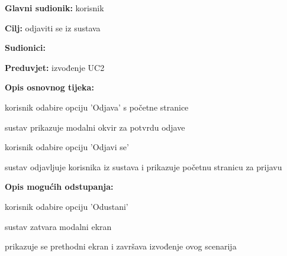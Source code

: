 					\noindent {}
					\begin{packed_item}
	
						\item \textbf{Glavni sudionik: }korisnik
						\item  \textbf{Cilj:} odjaviti se iz sustava 
						\item  \textbf{Sudionici:} 
						\item  \textbf{Preduvjet:} izvođenje UC2
						\item  \textbf{Opis osnovnog tijeka:}
						
						\item[] \begin{packed_enum}
							\item korisnik odabire opciju 'Odjava' s početne stranice
							\item sustav prikazuje modalni okvir za potvrdu odjave
							\item korisnik odabire opciju 'Odjavi se'
							\item sustav odjavljuje korisnika iz sustava i prikazuje početnu stranicu za prijavu

						\end{packed_enum}

						\item  \textbf{Opis mogućih odstupanja:}
						
						\item[] \begin{packed_item}
	
							\item[3.a] korisnik odabire opciju 'Odustani'
							\item [] \begin{packed_enum}
								\item sustav zatvara modalni ekran
								\item prikazuje se prethodni ekran i završava izvođenje ovog scenarija
							\end{packed_enum}
						\end{packed_item}
					\end{packed_item}
                    
